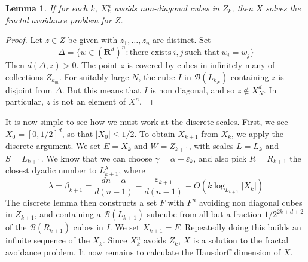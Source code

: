 \documentclass{article}
\theoremstyle{plain}
\newtheorem{lemma}{Lemma}
\theoremstyle{plain}
\begin{document}
\begin{lemma}
	If for each $k$, $X_k^n$ avoids non-diagonal cubes in $Z_k$, then $X$ solves the fractal avoidance problem for $Z$.
\end{lemma}
\begin{proof}
	Let $z \in Z$ be given with $z_1, \dots, z_n$ are distinct. Set
	\[ \Delta = \{ w \in (\mathbf{R}^d)^n : \text{there exists}\ i,j\ \text{such that}\ w_i = w_j \} \]
	Then $d(\Delta,z) > 0$. The point $z$ is covered by cubes in infinitely many of collections $Z_{k_m}$. For suitably large $N$, the cube $I$ in $\mathcal{B}(L_{k_N})$ containing $z$ is disjoint from $\Delta$. But this means that $I$ is non diagonal, and so $z \not \in X_N^d$. In particular, $z$ is not an element of $X^n$.
\end{proof}

It is now simple to see how we must work at the discrete scales. First, we see $X_0 = [0,1/2]^d$, so that $|X_0| \leq 1/2$. To obtain $X_{k+1}$ from $X_k$, we apply the discrete argument. We set $E = X_k$ and $W = Z_{k+1}$, with scales $L = L_k$ and $S = L_{k+1}$. We know that we can choose $\gamma = \alpha + \varepsilon_k$, and also pick $R = R_{k+1}$ the closest dyadic number to $L_{k+1}^\lambda$, where
%
\[ \lambda = \beta_{k+1} = \frac{dn - \alpha}{d(n-1)} - \frac{\varepsilon_{k+1}}{d(n-1)} - O(k \log_{L_{k+1}} |X_k|) \]
%
The discrete lemma then constructs a set $F$ with $F^n$ avoiding non diagonal cubes in $Z_{k+1}$, and containing a $\mathcal{B}(L_{k+1})$ subcube from all but a fraction $1/2^{2k + d+2}$ of the $\mathcal{B}(R_{k+1})$ cubes in $I$. We set $X_{k+1} = F$. Repeatedly doing this builds an infinite sequence of the $X_k$. Since $X_k^n$ avoids $Z_k$, $X$ is a solution to the fractal avoidance problem. It now remains to calculate the Hausdorff dimension of $X$.



\end{document}
